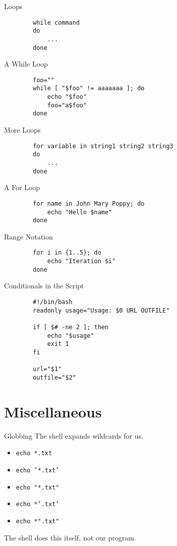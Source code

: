 \documentclass[pdf,usenames,dvipsnames,14pt]{beamer}%
\begin{document}
\begin{frame}[fragile]{Loops}
	\begin{verbatim}
		while command
		do
		    ...
		done
	\end{verbatim}
\end{frame}

\begin{frame}[fragile]{A While Loop}
	\begin{verbatim}
		foo=""
		while [ "$foo" != aaaaaaa ]; do
		    echo "$foo"
		    foo="a$foo"
		done
	\end{verbatim}
\end{frame}

\begin{frame}[fragile]{More Loops}
	\begin{verbatim}
		for variable in string1 string2 string3
		do
		    ...
		done
	\end{verbatim}
\end{frame}

\begin{frame}[fragile]{A For Loop}
	\begin{verbatim}
		for name in John Mary Poppy; do
		    echo "Hello $name"
		done
	\end{verbatim}
\end{frame}

\begin{frame}[fragile]{Range Notation}
	\begin{verbatim}
		for i in {1..5}; do
		    echo "Iteration $i"
		done
	\end{verbatim}
\end{frame}

\begin{frame}[fragile]{Conditionals in the Script}
	\begin{verbatim}
		#!/bin/bash
		readonly usage="Usage: $0 URL OUTFILE"
		
		if [ $# -ne 2 ]; then
		    echo "$usage"
		    exit 1
		fi
		
		url="$1"
		outfile="$2"
	\end{verbatim}
\end{frame}

\section{Miscellaneous}

\begin{frame}{Globbing}
	The shell expands wildcards for us.
	\begin{itemize}
		\item \texttt{echo *.txt}
		\item \texttt{echo '*.txt'}
		\item \texttt{echo "*.txt"}
		\item \texttt{echo *'.txt'}
		\item \texttt{echo *".txt"}
	\end{itemize}
	The shell does this itself, not our program.
\end{frame}
\end{document}
